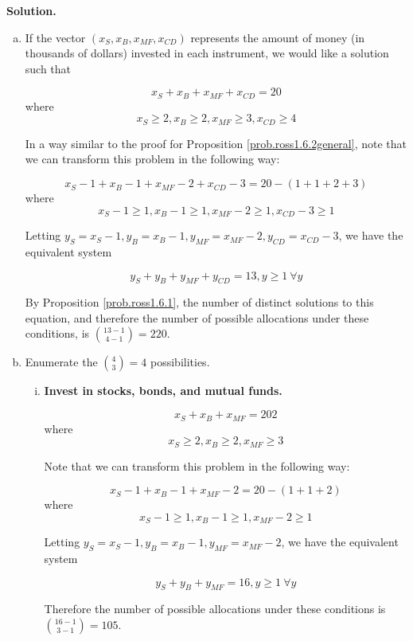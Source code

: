 \textbf{Solution.} 

\begin{enumerate}[(a)]

\item If the vector \((x_{S}, x_{B}, x_{MF}, x_{CD})\) represents the amount of money (in thousands of dollars) invested in each instrument, we would like a solution such that

\[
x_{S} + x_{B} + x_{MF} + x_{CD} = 20\] where \[x_{S} \geq 2, x_{B} \geq 2, x_{MF} \geq 3,  x_{CD} \geq 4
\]

In a way similar to the proof for Proposition \ref{prob.ross1.6.2general}, note that we can transform this problem in the following way:

\[
x_{S} - 1 +  x_{B} - 1 + x_{MF} - 2 + x_{CD} - 3 = 20 -  (1 + 1 + 2 + 3)\] where \[ x_{S} - 1 \geq 1,  x_{B} - 1 \geq 1, x_{MF} - 2 \geq 1,  x_{CD} - 3 \geq 1
\]

Letting \(y_{S} =  x_{S} - 1, y_{B} =  x_{B} - 1, y_{MF} = x_{MF} - 2, y_{CD} =x_{CD} - 3  \), we have the equivalent system

\[
y_{S} + y_{B} + y_{MF} + y_{CD} = 13, y \geq 1 \ \forall y
\]

By Proposition \ref{prob.ross1.6.1}, the number of distinct solutions to this equation, and therefore the number of possible allocations under these conditions, is \(\binom{13 - 1}{4 - 1} = \boxed{220} \).

\item Enumerate the \(\binom{4}{3} = 4\) possibilities.

\begin{enumerate}[(i)]

\item \textbf{Invest in stocks, bonds, and mutual funds.}

\[
x_{S} + x_{B} + x_{MF} = 202\] where \[x_{S} \geq 2, x_{B} \geq 2, x_{MF} \geq 3
\]

Note that we can transform this problem in the following way:

\[
x_{S} - 1 +  x_{B} - 1 + x_{MF} - 2= 20 -  (1 + 1 + 2)\] where \[ x_{S} - 1 \geq 1,  x_{B} - 1 \geq 1, x_{MF} - 2 \geq 1
\]

Letting \(y_{S} =  x_{S} - 1, y_{B} =  x_{B} - 1, y_{MF} = x_{MF} - 2 \), we have the equivalent system

\[
y_{S} + y_{B} + y_{MF} = 16, y \geq 1 \ \forall y
\]

Therefore the number of possible allocations under these conditions is \(\binom{16 - 1}{3 - 1} = \boxed{105} \).


\end{enumerate}
\end{enumerate}

